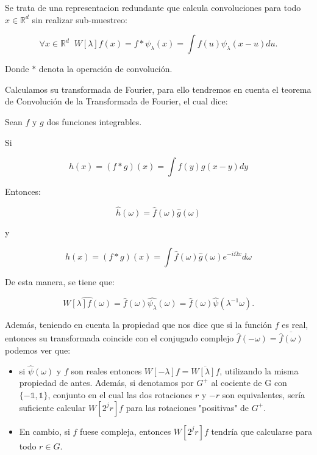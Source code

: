\medskip

\noindent Se trata de una representacion redundante que calcula convoluciones para todo $x \in \mathbb{R}^d$ sin realizar sub-muestreo: 

\begin{equation}
  \forall x \in  \mathbb{R}^d \;\; W[\lambda]f(x)= f \ast \psi_\lambda(x)=\int f(u)\psi_\lambda(x-u) du .
\end{equation}

\noindent Donde $\ast$ denota la operación de convolución. 

\medskip

\noindent Calculamos su transformada de Fourier, para ello tendremos en cuenta el teorema de Convolución de la Transformada de Fourier, el cual dice: 

\begin{teorema} \label{Teorema::Convolucion}
 Sean $f$ y $g$ dos funciones integrables.

 Si 

 $$h(x)=(f\ast g)(x)=\int f(y)g(x-y) dy$$

 Entonces: 

 $$\widehat{h}(\omega)=\widehat{f}(\omega) \widehat{g}(\omega)$$

 y 

 $$h(x)=(f \ast g)(x)= \int \widehat{f}(\omega) \widehat{g}(\omega) e^{-i\Omega x} d\omega$$
 
\end{teorema}

De esta manera, se tiene que: 

$$\widehat{W[\lambda]f(\omega)}=\widehat{f}(\omega)\widehat{\psi_\lambda}(\omega)=\widehat{f}(\omega)\widehat{\psi}(\lambda^{-1}\omega).$$

\noindent Además, teniendo en cuenta la propiedad que nos dice que si la función $f$ es real, entonces su transformada coincide con el conjugado complejo $\widehat{f}(-\omega)=\overline{\widehat{f}(\omega)}$ podemos ver que: 

\begin{itemize}
  \item si $\widehat{\psi}(\omega)$ y $f$ son reales entonces $W[-\lambda]f= \overline{W[\lambda]f}$, utilizando la misma propiedad de antes. Además, si denotamos por $G^{+}$ al cociente de G con $\lbrace-\mathbb{1},\mathbb{1}\rbrace$, conjunto en el cual las dos rotaciones $r$ y $-r$ son equivalentes, sería suficiente calcular $W[2^jr]f$ para las rotaciones "positivas" de $G^{+}$.
  \item En cambio, si $f$ fuese compleja, entonces $W[2^jr]f$ tendría que calcularse para todo $r \in G$.
\end{itemize}

